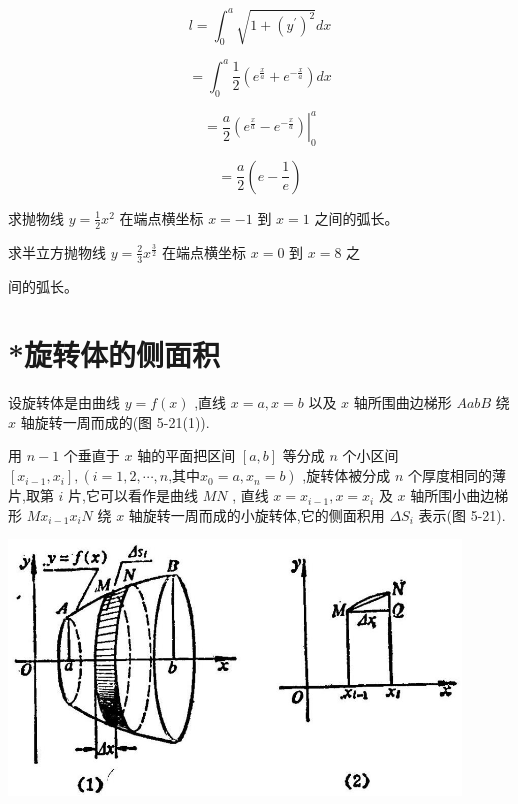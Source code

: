\documentclass[lang=cn,newtx,10pt,scheme=chinese]{elegantbook}
\begin{document}
\[
l = {\int }_{0}^{a}\sqrt{1 + {\left( {y}^{\prime }\right) }^{2}}{dx}
\]

\[
= {\int }_{0}^{a}\frac{1}{2}\left( {{e}^{\frac{x}{a}} + {e}^{-\frac{x}{a}}}\right) {dx}
\]

\[
= {\left. \frac{a}{2}\left( {e}^{\frac{x}{a}} - {e}^{-\frac{x}{a}}\right) \right| }_{0}^{a}
\]

\[
= \frac{a}{2}\left( {e - \frac{1}{e}}\right)
\]

\begin{problemset}[练习]

\item 求抛物线 \(y = \frac{1}{2}{x}^{2}\) 在端点横坐标 \(x = - 1\) 到 \(x = 1\) 之间的弧长。

\item 求半立方抛物线 \(y = \frac{2}{3}{x}^{\frac{3}{2}}\) 在端点横坐标 \(x = 0\) 到 \(x = 8\) 之

间的弧长。
\end{problemset}

\section{*旋转体的侧面积}

设旋转体是由曲线 \(y = f\left( x\right)\) ,直线 \(x = a,x = b\) 以及 \(x\) 轴所围曲边梯形 \({AabB}\) 绕 \(x\) 轴旋转一周而成的(图 5-21(1)).

用 \(n - 1\) 个垂直于 \(x\) 轴的平面把区间 \(\left\lbrack {a,b}\right\rbrack\) 等分成 \(n\) 个小区间 \(\left\lbrack {{x}_{i - 1},{x}_{i}}\right\rbrack ,\left( {i = 1,2,\cdots ,n\text{,其中}{x}_{0} = a,{x}_{n} = b}\right)\) ,旋转体被分成 \(n\) 个厚度相同的薄片,取第 \(i\) 片,它可以看作是曲线 \({MN}\) , 直线 \(x = {x}_{i - 1},x = {x}_{i}\) 及 \(x\) 轴所围小曲边梯形 \(M{x}_{i - 1}{x}_{i}N\) 绕 \(x\) 轴旋转一周而成的小旋转体,它的侧面积用 \(\Delta {S}_{i}\) 表示(图 5-21).

\begin{center}
\includegraphics[max width=0.9\textwidth]{images/01912c18-5c3f-733d-b775-749ba9897a9d_244_731175.jpg}
\end{center}
\end{document}
